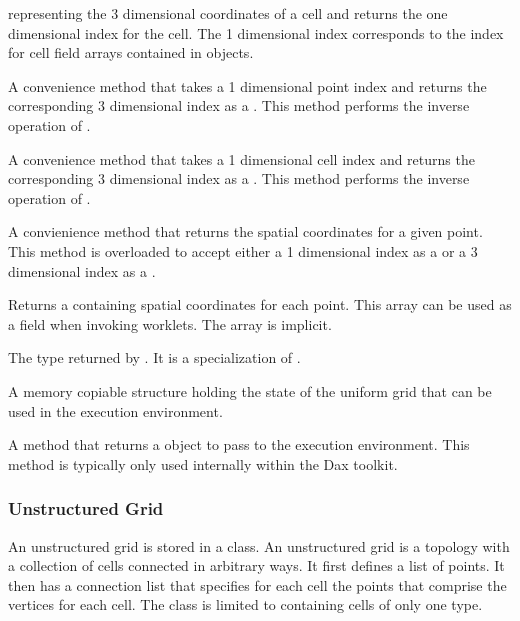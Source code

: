\begin{description}
   representing the 3 dimensional coordinates of a cell and
  returns the one dimensional index for the cell. The 1 dimensional index
  corresponds to the index for cell field arrays contained in
   objects.
\item[\textcode{ComputePointLocation}] A convenience method that takes a 1
  dimensional point index and returns the corresponding 3 dimensional index
  as a . This method performs the inverse operation of
  .
\item[\textcode{ComputeCellLocation}] A convenience method that takes a 1
  dimensional cell index and returns the corresponding 3 dimensional index
  as a . This method performs the inverse operation of
  .
\item[\textcode{ComputePointCoordinates}] A convienience method that
  returns the spatial coordinates for a given point. This method is
  overloaded to accept either a 1 dimensional index as a  or a 3
  dimensional index as a .
\item[\textcode{GetPointCoordinates}] Returns a 
  containing spatial coordinates for each point. This array can be used as
  a field when invoking worklets. The array is implicit.
\item[\textcode{PointCoordinatesType}] The type returned by
  . It is a specialization of
  .
\item[\textcode{TopologyStructConstExecution}] A memory copiable structure
  holding the state of the uniform grid that can be used in the execution
  environment.
\item[\textcode{PrepareForInput}] A method that returns a
   object to pass to the execution
  environment. This method is typically only used internally within the Dax
  toolkit.
\end{description}


\subsubsection{Unstructured Grid}


An unstructured grid is stored in a  class. An
unstructured grid is a topology with a collection of cells connected in
arbitrary ways. It first defines a list of points. It then has a connection
list that specifies for each cell the points that comprise the vertices for
each cell. The  class is limited to containing
cells of only one type.

